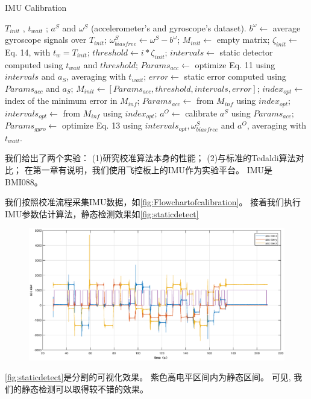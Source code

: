 \documentclass[
  type=master
]{gdutthesis}
\begin{document}
\begin{algorithm} 
	\caption{IMU Calibration} 
	\label{alg1} 
	\begin{algorithmic}
		\REQUIRE $T_{init}$ , $t_{wait}$ ; $a^S$ and $\omega^S$ (accelerometer's and
		gyroscope's dataset).
		\STATE $b^{\omega} \gets$ average gyroscope signals over $T_{init}$; 
		\STATE $\omega^S_{biasfree} \gets \omega^S - b^{\omega}$; 
		\STATE $M_{init} \gets$ empty matrix; 
		\STATE $\zeta_{init} \gets $ Eq. 14, with $t_w = T_{init}$;
		\STATE $threshold \gets i*\zeta_{init}$;
		\STATE $intervals \gets$ static detector computed using $t_{wait}$ and $threshold$;
		\STATE $Params_{acc} \gets$ optimize Eq. 11 using
		$intervals$ and $a_S$, averaging with $t_{wait}$; 
		\STATE $error \gets $ static error computed using $Params_{acc}$ and $a_S$;
		\STATE $M_{init} \gets [Params_{acc},threshold,intervals,error]$;
		\ENDFOR
		\STATE $index_{opt} \gets $ index of the minimum error in $M_{inf}$; 
		\STATE $Params_{acc} \gets $ from $M_{inf}$ using $index_{opt}$; 
		\STATE $intervals_{opt} \gets $ from $M_{inf}$ using $index_{opt}$; 
		\STATE $a^O \gets$ calibrate $a^S$ using $Params_{acc}$;
		\STATE $Params_{gyro} \gets $ optimize Eq. 13 using $intervals_{opt},\omega^S_{biasfree}$ and $a^O$, averaging with $t_{wait}$. 
	\end{algorithmic} 
\end{algorithm}

我们给出了两个实验：
(1)研究校准算法本身的性能；
(2)与标准的Tedaldi算法对比；
在第一章有说明，我们使用飞控板上的IMU作为实验平台。
IMU是BMI088。

我们按照校准流程采集IMU数据，如\autoref{fig:Flowchartofcalibration}。
接着我们执行IMU参数估计算法，静态检测效果如\autoref{fig:staticdetect}
\begin{figure}[htbp]
	\centering
	\includegraphics[width=1.0\textwidth]{staticdetect.eps}
	\label{fig:staticdetect}
\end{figure}
\autoref{fig:staticdetect}是分割的可视化效果。
紫色高电平区间内为静态区间。
可见, 我们的静态检测可以取得较不错的效果。
\end{document}
